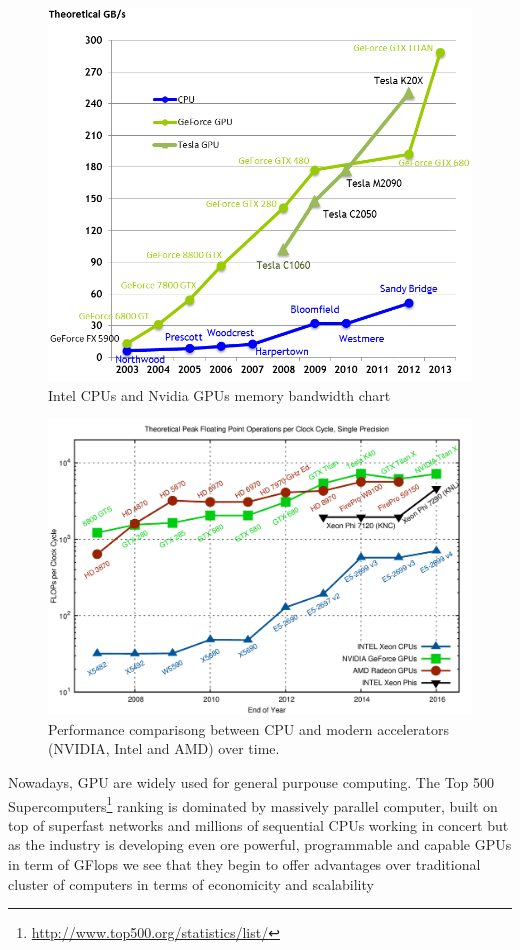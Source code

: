     \begin{figure}
    	\centering
    	\includegraphics[scale=0.4]{./images/parallel_programming/memory-bandwidth}
    	\caption{Intel CPUs and Nvidia GPUs memory bandwidth
    		chart}\label{CPU-VS-GPU_MEMORY}
    \end{figure}
    \begin{figure}
    	\centering
    	\includegraphics[scale=0.3]{./images/parallel_programming/cpu-vs-gpu}
    	\caption{Performance comparisong between CPU and modern accelerators (NVIDIA, Intel and AMD) over time.}\label{CPU-VS-GPU_GFLOP}
    \end{figure}
    Nowadays, GPU are widely used for general purpouse computing. The Top 500 Supercomputers\footnote{\url{http://www.top500.org/statistics/list/}} ranking is dominated by massively parallel computer, built on top of superfast networks and millions of sequential CPUs working in concert but as the industry is developing even ore powerful, programmable and capable GPUs in term of GFlops  we see that they begin to offer advantages over traditional cluster of computers in terms of economicity and scalability
    
